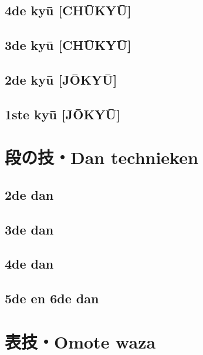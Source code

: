 \documentclass[a4paper, 12pt]{article}
\begin{document}
\newpage
\subsection{4de ky\={u} [CH\={U}KY\={U}]}


\newpage
\subsection{3de ky\={u} [CH\={U}KY\={U}]}


\newpage
\subsection{2de ky\={u} [J\={O}KY\={U}]}


\newpage
\subsection{1ste ky\={u} [J\={O}KY\={U}]}


\newpage
\section{段の技・Dan technieken}


\newpage
\subsection{2de dan}


\newpage
\subsection{3de dan}


\newpage
\subsection{4de dan}


\newpage
\subsection{5de en 6de dan}


\label{omotewaza}
\section{表技・Omote waza}
\end{document}
